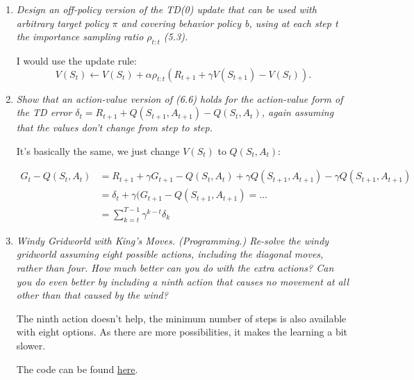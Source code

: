 \documentclass[12pt,a4paper]{article}
\begin{document}
\begin{enumerate}
\item
\textit{Design an off-policy version of the TD(0) update that can be used with
arbitrary target policy $\pi$ and covering behavior policy b, using at each step t the importance
sampling ratio $\rho_{t:t}$ (5.3).}

I would use the update rule:
\[V(S_t) \leftarrow V(S_t) + \alpha \rho_{t:t} (R_{t + 1} + \gamma V(S_{t + 1}) - V(S_t)).\]

\item
\textit{Show that an action-value version of (6.6) holds for the action-value form
of the TD error $\delta_t = R_{t+1} + Q(S_{t+1}, A_{t+1}) - Q(S_t, A_t)$, again
assuming that the values don’t change from step to step.}

It's basically the same, we just change $V(S_t)$ to $Q(S_t, A_t)$:

\begin{align*}
  G_t - Q(S_t, A_t) &= R_{t + 1} + \gamma G_{t + 1} - Q(S_t, A_t)
  + \gamma Q(S_{t + 1}, A_{t + 1}) - \gamma Q(S_{t + 1}, A_{t + 1})\\
  &= \delta_t + \gamma (G_{t + 1} - Q(S_{t + 1}, A_{t + 1}) = \dots \\
  &= \sum\limits_{k = t}^{T - 1} \gamma^{k - t} \delta_k
\end{align*}

\item
\textit{Windy Gridworld with King’s Moves. (Programming.) Re-solve the windy
gridworld assuming eight possible actions, including the diagonal moves, rather than four.
How much better can you do with the extra actions? Can you do even better by including
a ninth action that causes no movement at all other than that caused by the wind?}

The ninth action doesn't help, the minimum number of steps is also available with
eight options. As there are more possibilities, it makes the learning a bit slower.

The code can be found \href{https://github.com/hannagabor/SBRL/blob/master/6.9/windy_gridworld.ipynb}{here}.


\end{enumerate}
\end{document}
